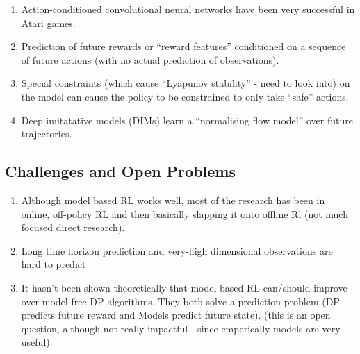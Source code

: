 \documentclass{article}
\begin{document}
\begin{enumerate}
  \item Action-conditioned convolutional neural networks have been very successful in Atari games.
  \item Prediction of future rewards or ``reward features'' conditioned on a sequence of future actions (with no actual prediction of observations).
  \item Special constraints (which cause ``Lyapunov stability'' - need to look into) on the model can cause the policy to be constrained to only take ``safe'' actions.
  \item Deep imitatative models (DIMs) learn a ``normalising flow model'' over future trajectories.
\end{enumerate}

\subsection{Challenges and Open Problems}

\begin{enumerate}
  \item Although model based RL works well, most of the research has been in online, off-policy RL and then basically slapping it onto offline Rl (not much focused direct research).
  \item Long time horizon prediction and very-high dimensional observations are hard to predict
    \item It hasn't been shown theoretically that model-based RL can/should improve over model-free DP algorithms. They both solve a prediction problem (DP predicts future reward and Models predict future state). (this is an open question, although not really impactful - since emperically models are very useful)
    \end{enumerate}
\end{document}
